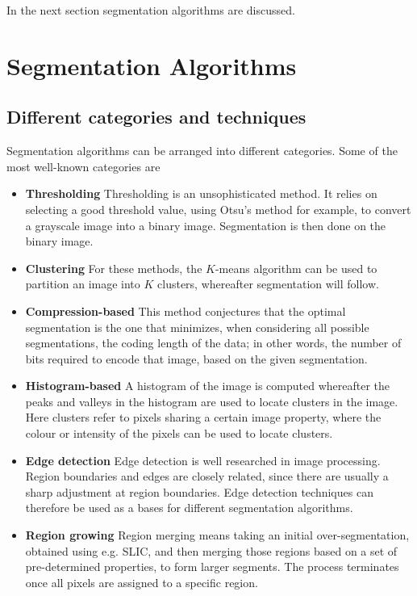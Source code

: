 \documentclass[a4paper,10pt]{article}
\begin{document}
In the next section segmentation algorithms are discussed.  

\newpage
\section{Segmentation Algorithms}
\subsection{Different categories and techniques}
Segmentation algorithms can be arranged into different categories. 
Some of the most well-known categories are
\begin{itemize}
 \item \textbf{Thresholding}\cite{threshold}  Thresholding is an unsophisticated method. It
relies on
     selecting a good threshold
     value, using Otsu's method for example, to convert a grayscale image into
a binary image.  Segmentation is
     then done on the binary image. 
 \item \textbf{Clustering} For these methods, the $K$-means algorithm
can be used to partition an image into $K$ clusters, whereafter
segmentation will follow.
 \item \textbf{Compression-based}\cite{compression} This method conjectures that the
optimal segmentation is the one that minimizes, when considering all possible
segmentations, the coding length of the data; in other words, the number of bits
required to encode that image, based on the given segmentation.
 \item \textbf{Histogram-based}\cite{threshold}  A histogram of 
the image is computed whereafter the peaks and valleys in the histogram
are used to locate clusters in the image.  Here clusters refer to pixels
sharing a certain image property, where the colour or intensity of the pixels can be used
to
locate clusters.
 \item \textbf{Edge detection}\cite{edge} Edge detection is well researched in image
processing.  Region boundaries and edges are closely related,
since there are usually a sharp adjustment at region boundaries.  Edge detection
techniques can therefore be used as a bases for different segmentation
algorithms.
 \item \textbf{Region growing}\cite{threshold} Region merging means taking an initial 
 over-segmentation,
obtained using e.g. SLIC, and then merging those regions based on a set of
pre-determined properties, to form larger segments.  The process
terminates once all pixels are assigned to a specific region.  

\end{itemize}
\end{document}
